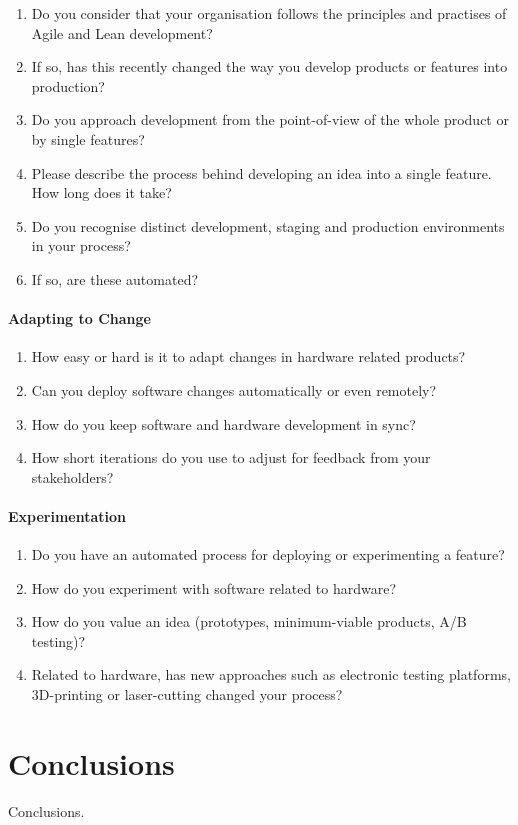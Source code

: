 \documentclass[english]{tktltiki2}
\begin{document}
\begin{enumerate}

    \item Do you consider that your organisation follows the principles and practises of Agile and Lean development?
    \item If so, has this recently changed the way you develop products or features into production?
    \item Do you approach development from the point-of-view of the whole product or by single features?
    \item Please describe the process behind developing an idea into a single feature. How long does it take?
    \item Do you recognise distinct development, staging and production environments in your process?
    \item If so, are these automated?

\end{enumerate}

\paragraph{Adapting to Change}

\begin{enumerate}[resume]

    \item How easy or hard is it to adapt changes in hardware related products?
    \item Can you deploy software changes automatically or even remotely?
    \item How do you keep software and hardware development in sync?
    \item How short iterations do you use to adjust for feedback from your stakeholders?

\end{enumerate}

\paragraph{Experimentation}

\begin{enumerate}[resume]

    \item Do you have an automated process for deploying or experimenting a feature?
    \item How do you experiment with software related to hardware?
    \item How do you value an idea (prototypes, minimum-viable products, A/B testing)?
    \item Related to hardware, has new approaches such as electronic testing platforms, 3D-printing or laser-cutting changed your process?

\end{enumerate}


\section{Conclusions}

Conclusions.




\end{document}
